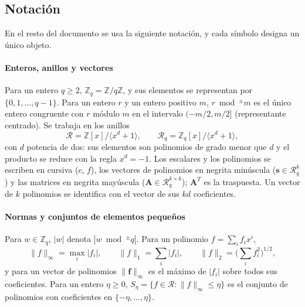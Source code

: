 \subsection{Notación}
\label{sec:notacion}

En el resto del documento se usa la siguiente notación, y cada símbolo designa un único objeto.

\paragraph{Enteros, anillos y vectores}
Para un entero $q \ge 2$, $\mathbb{Z}_q = \mathbb{Z}/q\mathbb{Z}$, y sus elementos se representan por $\{0, 1, \dots, q-1\}$. Para un entero $r$ y un entero positivo $m$, $r \bmod^{\pm} m$ es el único entero congruente con $r$ módulo $m$ en el intervalo $(-m/2, m/2]$ (representante centrado). Se trabaja en los anillos
\begin{equation}
\mathcal{R} = \mathbb{Z}[x]/\langle x^{d}+1\rangle, \qquad \mathcal{R}_q = \mathbb{Z}_q[x]/\langle x^{d}+1\rangle,
\end{equation}
con $d$ potencia de dos: sus elementos son polinomios de grado menor que $d$ y el producto se reduce con la regla $x^{d} = -1$. Los escalares y los polinomios se escriben en cursiva ($c$, $f$), los vectores de polinomios en negrita minúscula ($\mathbf{s} \in \mathcal{R}_q^{k}$) y las matrices en negrita mayúscula ($\mathbf{A} \in \mathcal{R}_q^{k \times k}$); $\mathbf{A}^{T}$ es la traspuesta. Un vector de $k$ polinomios se identifica con el vector de sus $k d$ coeficientes.

\paragraph{Normas y conjuntos de elementos pequeños}
Para $w \in \mathbb{Z}_q$, $|w|$ denota $|w \bmod^{\pm} q|$. Para un polinomio $f = \sum_{i} f_i x^i$,
\begin{equation}
\|f\|_\infty = \max_i |f_i|, \qquad \|f\|_1 = \sum_i |f_i|, \qquad \|f\|_2 = \Big(\sum_i f_i^2\Big)^{1/2},
\end{equation}
y para un vector de polinomios $\|\mathbf{f}\|_\infty$ es el máximo de $|f_i|$ sobre todos sus coeficientes. Para un entero $\eta \ge 0$, $S_\eta = \{ f \in \mathcal{R} : \|f\|_\infty \le \eta \}$ es el conjunto de polinomios con coeficientes en $\{-\eta, \dots, \eta\}$.

